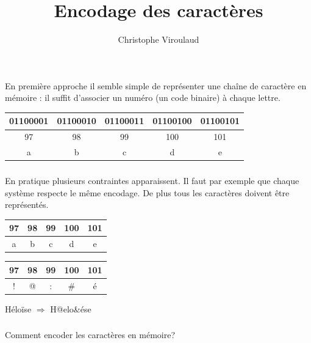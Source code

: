 \documentclass[svgnames,11pt]{beamer}
\author[]{Christophe Viroulaud}
\title{Encodage des caractères}
\date{\framebox{\textbf{DonRep 14}}}
\institute{Première - NSI}
\begin{document}
\begin{frame}
\titlepage
\end{frame}
\begin{frame}
    \frametitle{}

    En première approche il semble simple de représenter une chaîne de caractère en mémoire : il
suffit d’associer un numéro (un code binaire) à chaque lettre.
\begin{center}
    \begin{tabular}{|*{5}{c|}}
        \hline
        01100001&01100010&01100011&01100100&01100101\\
        \hline
        97&98&99&100&101\\
        \hline
        a&b&c&d&e\\
        \hline
    \end{tabular}
\end{center}
\end{frame}
\begin{frame}
    \frametitle{}

    En pratique plusieurs contraintes apparaissent. Il faut par exemple que chaque système respecte le même encodage. De plus tous les caractères doivent être représentés.
\begin{multicols}{2}
    \begin{center}
        \begin{tabular}{|*{5}{c|}}
            \hline
            97&98&99&100&101\\
            \hline
            a&b&c&d&e\\
            \hline
        \end{tabular}
    \end{center}
    \begin{center}
        \begin{tabular}{|*{5}{c|}}
            \hline
            97&98&99&100&101\\
            \hline
            !&@&:&\#&é\\
            \hline
        \end{tabular}
    \end{center}
\end{multicols}
\begin{center}
    {\Large Héloïse $\Rightarrow$ H@elo\&ése} 
\end{center}
\end{frame}
\begin{frame}
    \frametitle{}

    \begin{framed}
        \centering Comment encoder les caractères en mémoire?
    \end{framed}

\end{frame}
\end{document}
